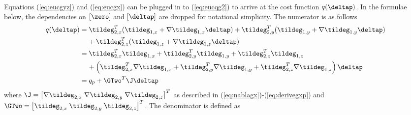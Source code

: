 Equations (\ref{eq:eucgyz}) and (\ref{eq:eucgx}) can be plugged in to (\ref{eq:eucqg2}) to arrive at the cost function $q(\deltap)$. In the formulae below, the dependencies on $[\zero]$ and $[\deltap]$ are dropped for notational simplicity. The numerator is as follows
\begin{equation}
  \begin{aligned}\label{eq:q_dp_num}
    q(\deltap) &= \tildeg_{2,x}^T (\tildeg_{1,x} + \nabla \tildeg_{1,x} \deltap) + \tildeg_{2,y}^T (\tildeg_{1,y} + \nabla \tildeg_{1,y} \deltap) \\
    & \hspace{4 mm} + \tildeg_{2,z}^T (\tildeg_{1,z} + \nabla \tildeg_{1,z} \deltap) \\
    &= \tildeg_{2,x}^T \tildeg_{1,x} + \tildeg_{2,y}^T \tildeg_{1,y} + \tildeg_{2,z}^T \tildeg_{1,z} \\     
    & \hspace{4 mm} + \left( \tildeg_{2,x}^T \nabla \tildeg_{1,x} + \tildeg_{2,y}^T \nabla \tildeg_{1,y} + \tildeg_{2,z}^T \nabla \tildeg_{1,z} \right) \deltap \\
    &= q_p + \GTwo^T \J \deltap
  \end{aligned}
\end{equation}
where $\J = \left[ \nabla \tildeg_{2,x} \; \nabla \tildeg_{2,y} \; \nabla \tildeg_{2,z} \right]^T$ as described in (\ref{eq:nablagx})-(\ref{eq:derivegxp}) and $\GTwo = \left[ \tildeg_{2,x} \; \tildeg_{2,y} \; \tildeg_{2,z} \right]^T$. The denominator is defined as
